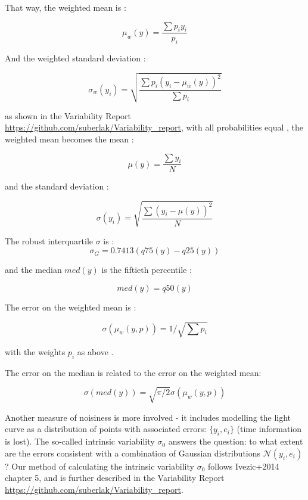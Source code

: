 \documentclass[fleqn,usenatbib]{mnras}  %
\begin{document}
That way, the weighted mean is  :

\begin{equation}
\mu_{w}(y) = \frac{\sum{p_{i}y_{i}}}{p_{i}}
\end{equation}

And the weighted standard deviation : 

\begin{equation}
\sigma_{w}(y_{i}) = \sqrt{\frac{\sum{p_{i} (y_{i} - \mu_{w}(y))^{2}}}{\sum{p_{i}}}}
\end{equation}

as shown in the Variability Report \url{https://github.com/suberlak/Variability_report}, with all probabilities equal , the weighted mean becomes the mean : 

\begin{equation}
\mu(y) = \frac{\sum{y_{i}}}{N}
\end{equation}

and  the standard deviation : 

\begin{equation}
\sigma(y_{i}) = \sqrt{\frac{\sum (y_{i} - \mu(y))^{2}}{N}}
\end{equation}


The robust interquartile $\sigma$ is :
\begin{equation}
\sigma_{G} = 0.7413 (q75(y) - q25(y))
\end{equation}

and the median  $med(y)$ is the fiftieth percentile  : 

 \begin{equation}
 med(y) = q50(y)
 \end{equation}


The error on the weighted mean is :

\begin{equation}
\sigma(\mu_{w}(y,p)) = 1 / \sqrt{\sum{p_{i}}}
\end{equation}

with the weights $p_{i}$ as above . 


The error on the median is related to the error on the weighted  mean: 

\begin{equation}
\sigma(med(y)) = \sqrt{\pi / 2 } \sigma(\mu_{w}(y,p))
\end{equation}





Another measure of noisiness is more involved - it includes modelling the light curve as a  distribution of points with associated errors:  $\{ y_{i}, e_{i}\}$ (time information is lost). The so-called intrinsic variability $\sigma_{0}$ answers the question:  to what extent are the errors consistent with a combination of Gaussian distributions  $\mathcal{N}(y_{i}, e_{i})$ ? Our method of calculating the intrinsic variability $\sigma_{0}$ follows Ivezic+2014 chapter 5, and is further described in the Variability Report  \url{https://github.com/suberlak/Variability_report}. 
\end{document}
